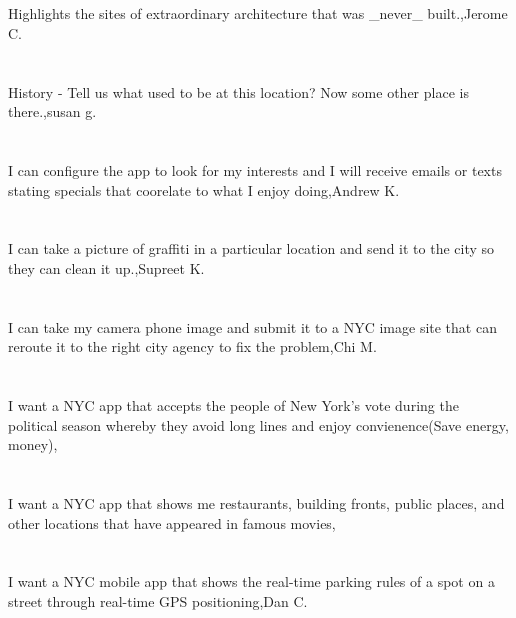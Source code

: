 \section{} Highlights the sites of extraordinary architecture that was \_never\_ built.,Jerome C.	
\section{}  History - Tell us what used to be at this location? Now some other place is there.,susan g.	
\section{}I can configure the app to look for my interests and I will receive emails or texts stating specials that coorelate to what I enjoy doing,Andrew K.	
\section{}I can take a picture of graffiti in a particular location and send it to the city so they can clean it up.,Supreet K.	
\section{}I can take my camera phone image and submit it to a NYC image site that can reroute it to the right city agency to fix the problem,Chi  M.	
\section{} I want a NYC app that accepts the people of New York's vote during the political season whereby they avoid long lines and enjoy convienence(Save energy, money),	
\section{}I want a NYC app that shows me restaurants, building fronts, public places, and other locations that have appeared in famous movies,	
\section{}I want a NYC mobile app that shows the real-time parking rules of a spot on a street through real-time GPS positioning,Dan C.	
